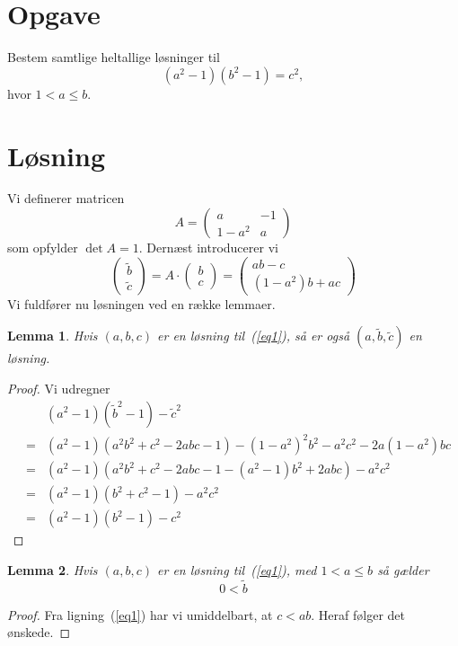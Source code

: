 \documentclass[12pt,oneside,a4paper]{article}
\newcommand{\bas}{\begin{eqnarray*}}
\newcommand{\eas}{\end{eqnarray*}}
\newcommand{\be}{\begin{equation}}
\newcommand{\ee}{\end{equation}}
\newtheorem{lem}{Lemma}[section]
\begin{document}
\section*{Opgave}
Bestem samtlige heltallige løsninger til
\be
(a^2-1)(b^2-1) = c^2,
\label{eq1}
\ee
hvor $1<a\le b$.

\section*{Løsning}
Vi definerer matricen 
$$
A = \left(\begin{array}{cc}
        a & -1 \\
        1-a^2 & a
\end{array}\right)
$$
som opfylder $\det A = 1$. Dernæst introducerer vi 
$$
\left(\begin{array}{c}\tilde b \\ \tilde c\end{array}\right) = 
A \cdot \left(\begin{array}{c} b \\ c\end{array}\right) =
\left(\begin{array}{c} ab-c \\ (1-a^2)b+ac\end{array}\right)
$$
Vi fuldfører nu løsningen ved en række lemmaer.

\begin{lem}
    Hvis $(a,b,c)$ er en løsning til~(\ref{eq1}), så er også $(a,\tilde b,
    \tilde c)$ en løsning.
\end{lem}
\begin{proof}
    Vi udregner
    \bas
    && (a^2-1)({\tilde b}^2-1) - {\tilde c}^2 \\
    &=& (a^2-1)\left(a^2b^2 + c^2 - 2abc - 1\right) - (1-a^2)^2b^2-a^2c^2-2a(1-a^2)bc \\
    &=& (a^2-1)\left(a^2b^2 + c^2 - 2abc - 1 - (a^2-1)b^2 + 2abc\right) - a^2c^2 \\
    &=& (a^2-1)(b^2 + c^2 - 1) - a^2c^2 \\
    &=& (a^2-1)(b^2-1) - c^2
    \eas
\end{proof}

\begin{lem}
    Hvis $(a,b,c)$ er en løsning til~(\ref{eq1}), med $1<a\le b$
    så gælder
    $$
    0 < \tilde b
    $$
\end{lem}
\begin{proof}
    Fra ligning~(\ref{eq1}) har vi umiddelbart, at $c<ab$. Heraf følger det ønskede.
\end{proof}
\end{document}
